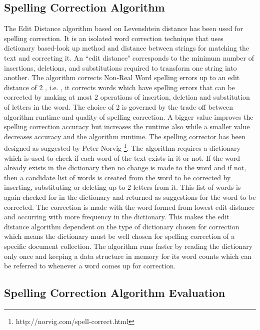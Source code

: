 \documentclass[letterpaper,11pt]{report}
\begin{document}
\subsection{Spelling Correction Algorithm}
\label{spell:algo}

The Edit Distance algorithm based on Levenshtein distance\cite{levenshtein1966binary} has been used for spelling correction. It is an isolated word correction technique that uses dictionary based-look up method and distance between strings for matching the text and correcting it. An ``edit distance" corresponds to the minimum number of insertions, deletions, and substitutions required to transform one string into another. The algorithm corrects Non-Real Word spelling errors up to an edit distance of 2 , i.e. , it corrects words which have spelling errors that can be corrected by making at most 2 operations of insertion, deletion and substitution of letters in the word. The choice of 2 is governed by the trade off between algorithm runtime and quality of spelling correction. A bigger value improves the spelling correction accuracy but increases the runtime also while a smaller value decreases accuracy and the algorithm runtime.
The spelling corrector has been designed as suggested by Peter Norvig \footnote{ http://norvig.com/spell-correct.html}. The algorithm requires a dictionary which is used to check if each word of the text exists in it or not. If the word already exists in the dictionary then no change is made to the word and if not, then a candidate list of words is created from the word to be corrected by inserting, substituting or deleting up to 2 letters from it.  This list of words is again checked for in the dictionary and returned as suggestions for the word to be corrected. The correction is made with the word formed from lowest edit distance and occurring with more frequency in the dictionary. This makes the edit distance algorithm dependent on the type of dictionary chosen for correction which means the dictionary must be well chosen for spelling correction of a specific document collection. The algorithm runs faster by reading the dictionary only once and keeping a data structure in memory for its word counts which can be referred to whenever a word comes up for correction.

\subsection{Spelling Correction Algorithm Evaluation}
\end{document}

